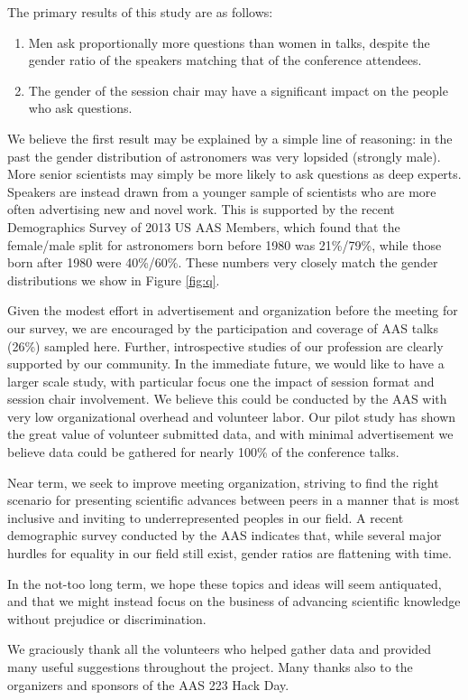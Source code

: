 \documentclass[iop]{emulateapj}
\begin{document}
The primary results of this study are as follows:
\begin{enumerate}
\item Men ask proportionally more questions than women in talks, despite the gender ratio of the speakers matching that of the conference attendees.
\item The gender of the session chair may have a significant impact on the people who ask questions.
\end{enumerate}

We believe the first result may be explained by a simple line of reasoning: in the past the gender distribution of astronomers was very lopsided (strongly male). More senior scientists may simply be more likely to ask questions as deep experts. Speakers are instead drawn from a younger sample of scientists who are more often advertising new and novel work. This is supported by the recent Demographics Survey of 2013 US AAS Members, which found that the female/male split for astronomers born before 1980 was 21\%/79\%, while those born after 1980 were 40\%/60\%. These numbers very closely match the gender distributions we show in Figure \ref{fig:q}.

Given the modest effort in advertisement and organization before the meeting for our survey, we are encouraged by the participation and coverage of AAS talks (26\%) sampled here. Further, introspective studies of our profession are clearly supported by our community. In the immediate future, we would like to have a larger scale study, with particular focus one the impact of session format and session chair involvement. We believe this could be conducted by the AAS with very low organizational overhead and volunteer labor. Our pilot study has shown the great value of volunteer submitted data, and with minimal advertisement we believe data could be gathered for nearly 100\% of the conference talks.

Near term, we seek to improve meeting organization, striving to find the right scenario for presenting scientific advances between peers in a manner that is most inclusive and inviting to underrepresented peoples in our field. A recent demographic survey conducted by the AAS indicates that, while several major hurdles for equality in our field still exist, gender ratios are flattening with time.

In the not-too long term, we hope these topics and ideas will seem antiquated, and that we might instead focus on the business of advancing scientific knowledge without prejudice or discrimination. 






\acknowledgements
We graciously thank all the volunteers who helped gather data and provided many useful suggestions throughout the project. Many thanks also to the organizers and sponsors of the AAS 223 Hack Day.
\end{document}
